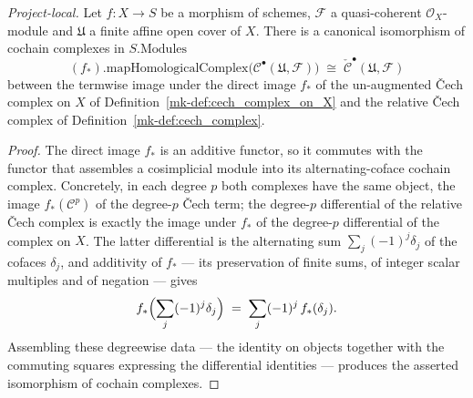 \begin{lemma}
  \label{mk-lem:pushforward_mapHC_cechComplexOnX}

  \textit{Project-local.}
  Let \(f : X \to S\) be a morphism of schemes, \(\mathcal{F}\) a quasi-coherent
  \(\mathcal{O}_X\)-module and \(\mathfrak{U}\) a finite affine open cover of \(X\).
  There is a canonical isomorphism of cochain complexes in \(S.\mathrm{Modules}\)
  \[
    (f_*).\mathrm{mapHomologicalComplex}\bigl(\mathcal{C}^\bullet(\mathfrak{U},
      \mathcal{F})\bigr)
      \;\cong\;
    \check{\mathcal{C}}^\bullet(\mathfrak{U}, \mathcal{F})
  \]
  between the termwise image under the direct image \(f_*\) of the un-augmented
  {\v C}ech complex on \(X\) of Definition~\ref{mk-def:cech_complex_on_X} and the
  relative {\v C}ech complex of Definition~\ref{mk-def:cech_complex}.
\end{lemma}
\begin{proof}
  The direct image \(f_*\) is an additive functor, so it commutes with the functor
  that assembles a cosimplicial module into its alternating-coface cochain complex.
  Concretely, in each degree \(p\) both complexes have the same object, the image
  \(f_*(\mathcal{C}^p)\) of the degree-\(p\) {\v C}ech term; the degree-\(p\)
  differential of the relative {\v C}ech complex is exactly the image under \(f_*\) of
  the degree-\(p\) differential of the complex on \(X\). The latter differential is
  the alternating sum \(\sum_{j} (-1)^j \delta_j\) of the cofaces \(\delta_j\), and
  additivity of \(f_*\) --- its preservation of finite sums, of integer scalar
  multiples and of negation --- gives
  \[
    f_*\Bigl(\sum_j (-1)^j \delta_j\Bigr)
      \;=\;
    \sum_j (-1)^j\, f_*(\delta_j).
  \]
  Assembling these degreewise data --- the identity on objects together with the
  commuting squares expressing the differential identities --- produces the asserted
  isomorphism of cochain complexes.
\end{proof}

